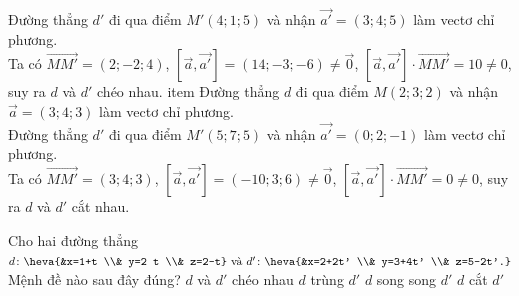 \begin{vd}
{\begin{enumerate}
			Đường thẳng $d'$ đi qua điểm $M'(4;1;5)$ và nhận $\overrightarrow{a'}=(3;4;5)$ làm vectơ chỉ phương.\\
			Ta có $\overrightarrow{MM'}=(2;-2;4)$, $\left[ \overrightarrow{a}, \overrightarrow{a'} \right] = (14;-3;-6) \ne \overrightarrow{0}$, $\left[ \overrightarrow{a}, \overrightarrow{a'} \right] \cdot \overrightarrow{MM'} =10 \ne 0$, suy ra $d$ và $d'$ chéo nhau.
			item Đường thẳng $d$ đi qua điểm $M(2;3;2)$ và nhận $\overrightarrow{a}=(3;4;3)$ làm vectơ chỉ phương.\\
			Đường thẳng $d'$ đi qua điểm $M'(5;7;5)$ và nhận $\overrightarrow{a'}=(0;2;-1)$ làm vectơ chỉ phương.\\
			Ta có $\overrightarrow{MM'}=(3;4;3)$, $\left[ \overrightarrow{a}, \overrightarrow{a'} \right] = (-10;3;6) \ne \overrightarrow{0}$, $\left[ \overrightarrow{a}, \overrightarrow{a'} \right] \cdot \overrightarrow{MM'} =0 \ne 0$, suy ra $d$ và $d'$ cắt nhau.
		\end{enumerate}
	}
\end{vd}
\baitaptn
\setcounter{ex}{0}

\begin{ex} %
	Cho hai đường thẳng $d\colon \heva{&x=1+t \\& y=2 t \\& z=2-t} \text{ và } d'\colon \heva{&x=2+2t' \\& y=3+4t' \\& z=5-2t'.}$ Mệnh đề nào sau đây đúng?
	\choice
	{$d$ và $d'$ chéo nhau}
	{$d$ trùng $d'$}
	{\True $d$ song song $d'$}
	{$d$ cắt $d'$}
\end{ex}

